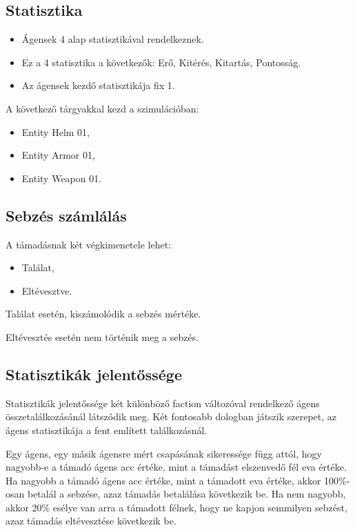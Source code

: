 
\subsection{Statisztika}
\label{statisztika}
\begin{itemize}
    \item Ágensek 4 alap statisztikával rendelkeznek.
    \item Ez a 4 statisztika a következők: Erő, Kitérés, Kitartás, Pontosság.
    \item Az ágensek kezdő statisztikája fix 1.
\end{itemize}

\noindent A következő tárgyakkal kezd a szimulációban:

\begin{itemize}
    \item Entity Helm 01,
    \item Entity Armor 01,
    \item Entity Weapon 01.
\end{itemize}

\subsection{Sebzés számlálás}

\label{számlálás}

A támadásnak két végkimenetele lehet:

\begin{itemize}
    \item Találat,
    \item Eltévesztve.
\end{itemize}

\noindent Találat esetén, kiszámolódik a sebzés mértéke. 

\noindent Eltévesztés esetén nem történik meg a sebzés. 

\subsection{Statisztikák jelentőssége}

Statisztikák jelentőssége két különböző faction változóval rendelkező ágens összetalálkozásánál látszódik meg.
Két fontosabb dologban játszik szerepet, az ágens statisztikája a fent említett találkozásnál.

Egy ágens, egy másik ágensre mért csapásának sikeressége függ attól, hogy nagyobb-e a támadó ágens acc értéke, mint a támadást elszenvedő fél eva értéke.
Ha nagyobb a támadó ágens acc értéke, mint a támadott eva értéke, akkor 100\%-osan betalál a sebzése, azaz támadás betalálása következik be.
Ha nem nagyobb, akkor 20\% esélye van arra a támadott félnek, hogy ne kapjon semmilyen sebzést, azaz támadás eltévesztése következik be.

